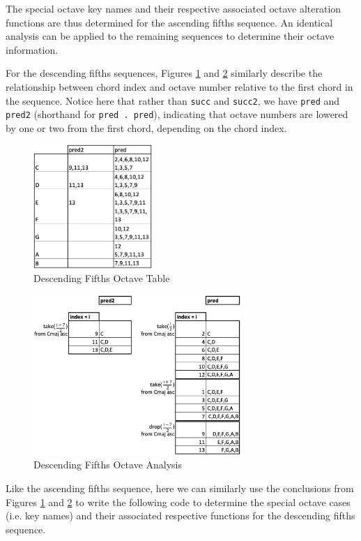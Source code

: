 \documentclass{report}
\begin{document}
The special octave key names and their respective associated octave alteration functions are thus determined for the ascending fifths sequence. An identical analysis can be applied to the remaining sequences to determine their octave information.

For the descending fifths sequences, Figures \ref{fig:desc_fifths_octave_grid} and \ref{fig:desc_fifths_octave_analysis} similarly describe the relationship between chord index and octave number relative to the first chord in the sequence. Notice here that rather than \verb.succ. and \verb.succ2., we have \verb.pred. and \verb.pred2. (shorthand for \verb!pred . pred!), indicating that octave numbers are lowered by one or two from the first chord, depending on the chord index.

\begin{figure}[h!]
\centering
\includegraphics[width=0.4\textwidth]{images/desc_fifths_octave_grid}
  \caption{Descending Fifths Octave Table}
  \label{fig:desc_fifths_octave_grid}
\end{figure}

\begin{figure}[h!]
\centering
\includegraphics[width=0.7\textwidth]{images/desc_fifths_octave_analysis}
  \caption{Descending Fifths Octave Analysis}
  \label{fig:desc_fifths_octave_analysis}
\end{figure}
\newpage
Like the ascending fifths sequence, here we can similarly use the conclusions from Figures \ref{fig:desc_fifths_octave_grid} and \ref{fig:desc_fifths_octave_analysis} to write the following code to determine the special octave cases (i.e. key names) and their associated respective functions for the descending fifths sequence.
\end{document}
